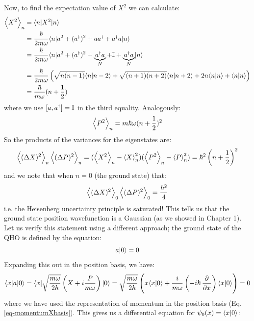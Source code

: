 Now, to find the expectation value of $X^2$ we can calculate:
\begin{equation}
    \begin{split}
        \left< X^2 \right>_n &= \langle n \rvert X^2\lvert n \rangle 
        \\ &= \frac{\hbar}{2m\omega}\langle n \rvert a^2 + (a^\dag)^2 + aa^\dag + a^\dag a \lvert n \rangle
        \\ &= \frac{\hbar}{2m\omega}\langle n \rvert a^2 + (a^\dag)^2 + \underbrace{a^\dag a}_{N} + \mathbb{I} + \underbrace{a^\dag a}_{N} \lvert n \rangle
        \\ &= \frac{\hbar}{2m\omega}\left(\sqrt{n(n-1)}\langle n \lvert n-2 \rangle + \sqrt{(n+1)(n+2)}\langle n \lvert n+2 \rangle + 2n\langle n \lvert n \rangle + \langle n \lvert n \rangle\right)
        \\ &= \frac{\hbar}{m\omega}(n + \frac{1}{2})
    \end{split}
\end{equation}
where we use $[a, a^\dag] = \mathbb{I}$ in the third equality. Analogously:
\begin{equation}
    \left< P^2 \right>_n = m\hbar \omega (n + \frac{1}{2})^2
\end{equation}
So the products of the variances for the eigenstates are:
\begin{equation}
    \left< (\Delta X)^2 \right>_n\left< (\Delta P)^2 \right>_n = (\left< X^2 \right>_n - \left< X \right>_n^2)(\left< P^2 \right>_n - \left< P \right>_n^2) = \hbar^2\left(n + \frac{1}{2}\right)^2
\end{equation}
and we note that when $n = 0$ (the ground state) that:
\begin{equation}
    \left< (\Delta X)^2 \right>_0\left< (\Delta P)^2 \right>_0 = \frac{\hbar^2}{4}
\end{equation}
i.e. the Heisenberg uncertainty principle is saturated! This tells us that the ground state position wavefunction is a Gaussian (as we showed in Chapter 1). Let us verify this statement using a different approach; the ground state of the QHO is defined by the equation:
\begin{equation}
    a\lvert 0 \rangle = 0
\end{equation}
Expanding this out in the position basis, we have:
\begin{equation}
    \bra{x}a\ket{0} = \bra{x}\sqrt{\frac{m\omega}{2\hbar}}\left(X + i\frac{P}{m\omega}\right)\ket{0} = \sqrt{\frac{m\omega}{2\hbar}}\left(x \braket{x}{0} + \frac{i}{m\omega}\left(-i\hbar\dpd{}{x}\right)\braket{x}{0}\right) = 0
\end{equation}
where we have used the representation of momentum in the position basis (Eq. \eqref{eq-momentumXbasis}). This gives us a differential equation for $\psi_0(x) = \langle x \lvert 0 \rangle$:
